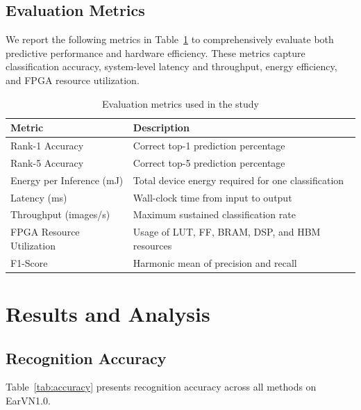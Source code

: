 \documentclass[11pt,a4paper]{article}
\begin{document}
\subsection{Evaluation Metrics}

We report the following metrics in Table~\ref{tab:metrics} to comprehensively evaluate both predictive performance and hardware efficiency. These metrics capture classification accuracy, system-level latency and throughput, energy efficiency, and FPGA resource utilization.

\begin{table}[H]
\centering
\begin{tabular}{|l|p{10cm}|}
\hline
\textbf{Metric} & \textbf{Description} \\
\hline
Rank-1 Accuracy & Correct top-1 prediction percentage \\
\hline
Rank-5 Accuracy & Correct top-5 prediction percentage \\
\hline
Energy per Inference (mJ) & Total device energy required for one classification \\
\hline
Latency (ms) & Wall-clock time from input to output \\
\hline
Throughput (images/s) & Maximum sustained classification rate \\
\hline
FPGA Resource Utilization & Usage of LUT, FF, BRAM, DSP, and HBM resources \\
\hline
F1-Score & Harmonic mean of precision and recall \\
\hline
\end{tabular}
\caption{Evaluation metrics used in the study}
\label{tab:metrics}
\end{table}

\section{Results and Analysis}\label{sec:results}

\subsection{Recognition Accuracy}

Table~\ref{tab:accuracy} presents recognition accuracy across all methods on EarVN1.0.
\end{document}
